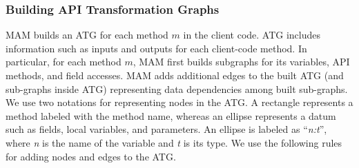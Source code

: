 \subsubsection{Building API Transformation Graphs}

MAM builds an ATG for each method $m$ in the client code.
ATG includes information such as inputs
and outputs for each client-code method. In particular, for
each method $m$, MAM first builds subgraphs for its variables,
API methods, and field accesses. MAM adds additional edges
to the built ATG (and sub-graphs inside ATG) representing
data dependencies among built sub-graphs.
We use two notations for representing nodes in the ATG. A rectangle
represents a method labeled with the method name, whereas an ellipse
represents a datum such as fields, local variables, and parameters.
An ellipse is labeled as ``\emph{n:t}'', where \emph{n} is the name
of the variable and \emph{t} is its type. We use the
following rules for adding nodes and edges to the ATG.



%

